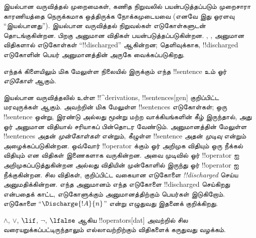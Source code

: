 \documentclass[../../../include/open-logic-section]{subfiles}
\begin{document}
      {}
      {}


\begin{explain}
இயல்பான வருவித்தல் முறைமைகள், கணித நிறுவலில் பயன்படுத்தப்படும் முறைசாரா
காரணியத்தை நெருக்கமாக ஒத்திருக்க நோக்கமுடையவை (எனவே இது ஓரளவு
``இயல்பானது''). இயல்பான வருவித்தல் நிறுவல்கள் எடுகோள்களுடன் தொடங்குகின்றன.
பிறகு அனுமான விதிகள் பயன்படுத்தப்படுகின்றன. \Intro{\lnot}, \Intro{\lif},
 அனுமான விதிகளால்
எடுகோள்கள் ``!!{discharged}'' ஆகின்றன; தெளிவுக்காக, !!{discharged} எடுகோளின்
பெயர் அனுமானத்தின் அருகே வைக்கப்படுகிறது.
\end{explain}

\begin{defn}[எடுகோள்]
எந்தக் கிளையிலும் மிக மேலுள்ள நிலையில் இருக்கும் எந்த !!{sentence} உம்
ஓர் \emph{எடுகோள்} ஆகும்.
\end{defn}

இயல்பான வருவித்தலில் உள்ள !!^{derivation}s, !!{sentence}s[gen] குறிப்பிட்ட
மரவுருக்கள் ஆகும். அவற்றின் மிக மேலுள்ள !!{sentence}s எடுகோள்கள்; ஒரு
!!{sentence} ஒன்று, இரண்டு அல்லது மூன்று மற்ற வாக்கியங்களின் கீழ் இருந்தால்,
அது ஓர் அனுமான விதியால் சரியாகப் பின்தொடர வேண்டும். அனுமானத்தின் மேலுள்ள
!!{sentence}s அதன் \emph{முன்கோள்கள்} என்றும், கீழுள்ள !!{sentence} அதன்
\emph{முடிவு} என்றும் அழைக்கப்படுகின்றன. ஒவ்வோர் !!{operator} க்கும் ஓர்
அறிமுக விதியும் ஒரு நீக்கல் விதியும் என விதிகள் இணைகளாக வருகின்றன. அவை
முடிவில் ஓர் !!{operator} ஐ அறிமுகப்படுத்துகின்றன அல்லது விதியின் முன்கோளில்
இருந்து ஓர் !!{operator} ஐ நீக்குகின்றன. சில விதிகள், குறிப்பிட்ட வகையான
எடுகோளை \emph{!!{discharged}} செய்ய அனுமதிக்கின்றன. எந்த அனுமானம் எந்த
எடுகோளை !!{discharged} செய்கிறது என்பதைக் காட்ட, எடுகோளுக்கும் அனுமானத்திற்கும்
பெயர்கள் இடுகிறோம். எடுகோளை ``$\Discharge{!A}{n}$'' என்று எழுதுவது இதனைக்
குறிக்கிறது.


%
	{$\land$, $\lor$, $\lif$, $\lnot$, $\lfalse$ ஆகிய !!{operator}s[dat]
அவற்றில் சில வரையறுக்கப்பட்டிருந்தாலும் எல்லாவற்றிற்கும் விதிகளைக் கருதுவது
வழக்கம்.}
\end{document}
